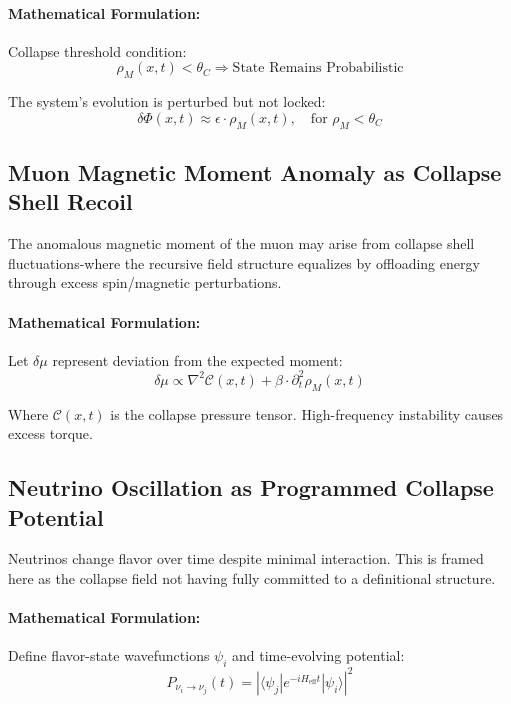 \paragraph{Mathematical Formulation:}
Collapse threshold condition:
\begin{equation}
\rho_M(x,t) < \theta_C \Rightarrow \text{State Remains Probabilistic}
\end{equation}

The system's evolution is perturbed but not locked:
\begin{equation}
\delta \Phi(x,t) \approx \epsilon \cdot \rho_M(x,t), \quad \text{for } \rho_M < \theta_C
\end{equation}

\subsection{Muon Magnetic Moment Anomaly as Collapse Shell Recoil}
The anomalous magnetic moment of the muon may arise from collapse shell fluctuations-where the recursive field structure equalizes by offloading energy through excess spin/magnetic perturbations.

\paragraph{Mathematical Formulation:}
Let $\delta \mu$ represent deviation from the expected moment:
\begin{equation}
\delta \mu \propto \nabla^2 \mathcal{C}(x,t) + \beta \cdot \partial_t^2 \rho_M(x,t)
\end{equation}

Where $\mathcal{C}(x,t)$ is the collapse pressure tensor. High-frequency instability causes excess torque.

\subsection{Neutrino Oscillation as Programmed Collapse Potential}
Neutrinos change flavor over time despite minimal interaction. This is framed here as the collapse field not having fully committed to a definitional structure.

\paragraph{Mathematical Formulation:}
Define flavor-state wavefunctions $\psi_i$ and time-evolving potential:
\begin{equation}
P_{\nu_i \rightarrow \nu_j}(t) = \left| \langle \psi_j | e^{-i H_{\text{eff}} t} | \psi_i \rangle \right|^2
\end{equation}

